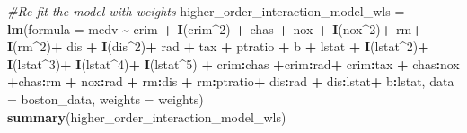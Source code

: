 \documentclass[
]{article}
\newenvironment{Shaded}{\begin{snugshade}}{\end{snugshade}}
\newcommand{\AttributeTok}[1]{\textcolor[rgb]{0.13,0.29,0.53}{#1}}
\newcommand{\CommentTok}[1]{\textcolor[rgb]{0.56,0.35,0.01}{\textit{#1}}}
\newcommand{\DecValTok}[1]{\textcolor[rgb]{0.00,0.00,0.81}{#1}}
\newcommand{\FunctionTok}[1]{\textcolor[rgb]{0.13,0.29,0.53}{\textbf{#1}}}
\newcommand{\NormalTok}[1]{#1}
\newcommand{\OtherTok}[1]{\textcolor[rgb]{0.56,0.35,0.01}{#1}}
\newcommand{\SpecialCharTok}[1]{\textcolor[rgb]{0.81,0.36,0.00}{\textbf{#1}}}
\begin{document}
\begin{Shaded}
\begin{Highlighting}[]
\CommentTok{\#Re{-}fit the model with weights}
\NormalTok{higher\_order\_interaction\_model\_wls }\OtherTok{=} \FunctionTok{lm}\NormalTok{(}\AttributeTok{formula =}\NormalTok{ medv }\SpecialCharTok{\textasciitilde{}}\NormalTok{ crim }\SpecialCharTok{+} \FunctionTok{I}\NormalTok{(crim}\SpecialCharTok{\^{}}\DecValTok{2}\NormalTok{) }\SpecialCharTok{+}\NormalTok{ chas }\SpecialCharTok{+}\NormalTok{ nox }\SpecialCharTok{+} \FunctionTok{I}\NormalTok{(nox}\SpecialCharTok{\^{}}\DecValTok{2}\NormalTok{)}\SpecialCharTok{+}\NormalTok{ rm}\SpecialCharTok{+} \FunctionTok{I}\NormalTok{(rm}\SpecialCharTok{\^{}}\DecValTok{2}\NormalTok{)}\SpecialCharTok{+}\NormalTok{ dis }\SpecialCharTok{+} \FunctionTok{I}\NormalTok{(dis}\SpecialCharTok{\^{}}\DecValTok{2}\NormalTok{)}\SpecialCharTok{+}\NormalTok{ rad }\SpecialCharTok{+}\NormalTok{ tax }\SpecialCharTok{+}\NormalTok{ ptratio }\SpecialCharTok{+}\NormalTok{ b }\SpecialCharTok{+}\NormalTok{ lstat }\SpecialCharTok{+} \FunctionTok{I}\NormalTok{(lstat}\SpecialCharTok{\^{}}\DecValTok{2}\NormalTok{)}\SpecialCharTok{+} \FunctionTok{I}\NormalTok{(lstat}\SpecialCharTok{\^{}}\DecValTok{3}\NormalTok{)}\SpecialCharTok{+} \FunctionTok{I}\NormalTok{(lstat}\SpecialCharTok{\^{}}\DecValTok{4}\NormalTok{)}\SpecialCharTok{+} \FunctionTok{I}\NormalTok{(lstat}\SpecialCharTok{\^{}}\DecValTok{5}\NormalTok{) }\SpecialCharTok{+}\NormalTok{ crim}\SpecialCharTok{:}\NormalTok{chas  }\SpecialCharTok{+}\NormalTok{crim}\SpecialCharTok{:}\NormalTok{rad}\SpecialCharTok{+}\NormalTok{ crim}\SpecialCharTok{:}\NormalTok{tax }\SpecialCharTok{+}\NormalTok{ chas}\SpecialCharTok{:}\NormalTok{nox }\SpecialCharTok{+}\NormalTok{chas}\SpecialCharTok{:}\NormalTok{rm }\SpecialCharTok{+}\NormalTok{ nox}\SpecialCharTok{:}\NormalTok{rad }\SpecialCharTok{+}\NormalTok{ rm}\SpecialCharTok{:}\NormalTok{dis }\SpecialCharTok{+}\NormalTok{ rm}\SpecialCharTok{:}\NormalTok{ptratio}\SpecialCharTok{+}\NormalTok{ dis}\SpecialCharTok{:}\NormalTok{rad }\SpecialCharTok{+}\NormalTok{ dis}\SpecialCharTok{:}\NormalTok{lstat}\SpecialCharTok{+}\NormalTok{ b}\SpecialCharTok{:}\NormalTok{lstat, }\AttributeTok{data =}\NormalTok{ boston\_data, }\AttributeTok{weights =}\NormalTok{ weights)}
\FunctionTok{summary}\NormalTok{(higher\_order\_interaction\_model\_wls)}
\end{Highlighting}
\end{Shaded}
\end{document}
